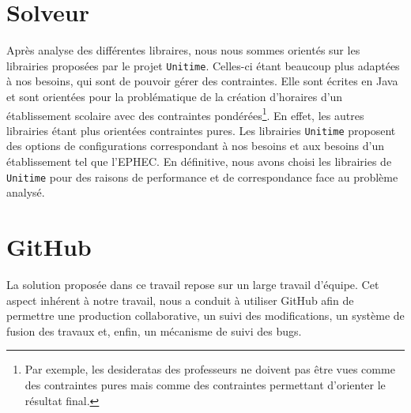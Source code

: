 \section{Solveur}

Après analyse des différentes libraires, nous nous sommes orientés sur les
librairies proposées par le projet \texttt{Unitime}. Celles-ci étant beaucoup plus adaptées à nos besoins, qui sont de pouvoir gérer des contraintes. 
\newline
\indent
Elle sont écrites en Java et sont orientées pour la problématique de la création d'horaires d'un établissement scolaire avec des contraintes pondérées\footnote{Par exemple, les desideratas des professeurs ne doivent pas être vues comme des contraintes pures mais comme des contraintes permettant d'orienter le résultat final.}. En effet, les autres librairies étant plus orientées contraintes pures.
\newline
\indent
Les librairies \texttt{Unitime} proposent des options de configurations correspondant à nos besoins et aux besoins d'un établissement tel que l'EPHEC. 
\newline
\indent
En définitive, nous avons choisi les librairies de \texttt{Unitime} pour des raisons de performance et de correspondance face au problème analysé.

\section{GitHub}

La solution proposée dans ce travail repose sur un large travail d'équipe. Cet aspect inhérent à notre travail, nous a conduit à utiliser GitHub afin de permettre une production collaborative, un suivi des modifications, un système de fusion des travaux et, enfin, un mécanisme de suivi des bugs. 


